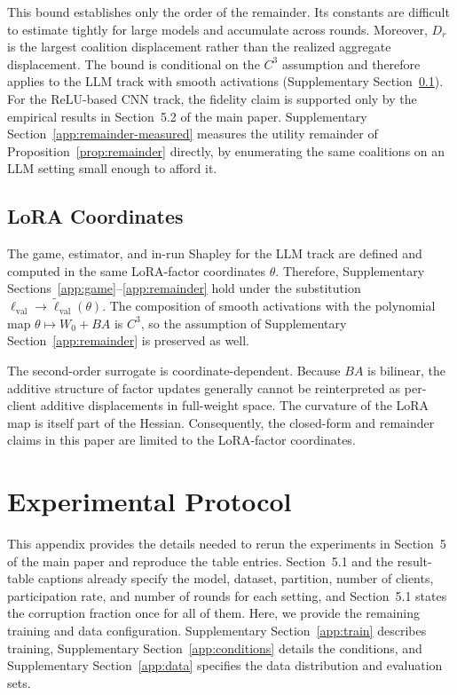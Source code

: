 \documentclass[letterpaper]{article} %
\theoremstyle{plain}
\newcommand{\lval}{\ell_{\mathrm{val}}}
\begin{document}
This bound establishes only the order of the remainder. Its constants are
difficult to estimate tightly for large models and accumulate across rounds.
Moreover, $D_r$ is the largest coalition displacement rather than the
realized aggregate displacement. The bound is conditional on the $C^3$
assumption and therefore applies to the LLM track with smooth activations
(Supplementary Section~\ref{app:lora}). For the ReLU-based CNN track, the
fidelity claim is supported only by the empirical results in Section~5.2 of
the main paper. Supplementary Section~\ref{app:remainder-measured} measures the
utility remainder of Proposition~\ref{prop:remainder} directly, by enumerating
the same coalitions on an LLM setting small enough to afford it.

\subsection{LoRA Coordinates}
\label{app:lora}

The game, estimator, and in-run Shapley for the LLM track are defined and
computed in the same LoRA-factor coordinates $\theta$. Therefore,
Supplementary Sections~\ref{app:game}--\ref{app:remainder} hold under the
substitution $\lval \to \tilde\ell_{\mathrm{val}}(\theta)$. The composition of
smooth activations with the polynomial map $\theta \mapsto W_0 + BA$ is
$C^3$, so the assumption of Supplementary Section~\ref{app:remainder} is
preserved as well.

The second-order surrogate is coordinate-dependent. Because $BA$ is bilinear,
the additive structure of factor updates generally cannot be reinterpreted as
per-client additive displacements in full-weight space. The curvature of the
LoRA map is itself part of the Hessian. Consequently, the closed-form and
remainder claims in this paper are limited to the LoRA-factor coordinates.

\section{Experimental Protocol}
\label{app:protocol}

This appendix provides the details needed to rerun the experiments in
Section~5 of the main paper and reproduce the table entries. Section~5.1 and
the result-table captions already specify the model, dataset, partition,
number of clients, participation rate, and number of rounds for each setting,
and Section~5.1 states the corruption fraction once for all of them. Here, we
provide the remaining training and data
configuration. Supplementary Section~\ref{app:train} describes training,
Supplementary Section~\ref{app:conditions} details the conditions, and
Supplementary Section~\ref{app:data} specifies the data distribution and
evaluation sets.
\end{document}
